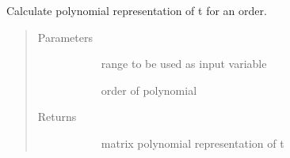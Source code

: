 \documentclass[letterpaper,10pt,english]{sphinxmanual}
\begin{document}

\begin{fulllineitems}
\label{\detokenize{autoapi/src/model/model/index:src.model.model.polynomial}}
Calculate polynomial representation of t for an order.
\begin{quote}\begin{description}
\item[{Parameters}] \leavevmode\begin{description}
\item[{}] \leavevmode{[}\sphinxhref{https://docs.python.org/3/library/stdtypes.html\#range}{\sphinxcode{\sphinxupquote{range}}}{]}
range to be used as input variable

\item[{}] \leavevmode{[}\sphinxhref{https://docs.python.org/3/library/functions.html\#int}{\sphinxcode{\sphinxupquote{int}}}{]}
order of polynomial

\end{description}

\item[{Returns}] \leavevmode\begin{description}
\item[{}] \leavevmode
matrix polynomial representation of t

\end{description}

\end{description}\end{quote}

\end{fulllineitems}

\end{document}
